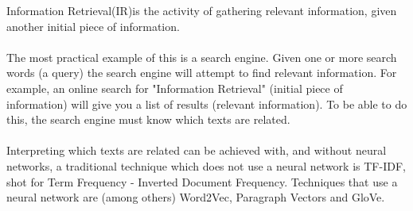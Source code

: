\documentclass[../../Thesis.tex]{subfiles}
\begin{document}
Information Retrieval(IR)is the activity of gathering relevant information, given another initial piece of information. 
\\\\The most practical example of this is a search engine. Given one or more search words (a query) the search engine will attempt to find relevant information. For example, an online search for "Information Retrieval" (initial piece of information) will give you a list of results (relevant information). To be able to do this, the search engine must know which texts are related. \\\\Interpreting which texts are related can be achieved with, and without neural networks, a traditional technique which does not use a neural network is TF-IDF, shot for Term Frequency - Inverted Document Frequency. Techniques that use a neural network are (among others) Word2Vec, Paragraph Vectors and GloVe.
\end{document}
